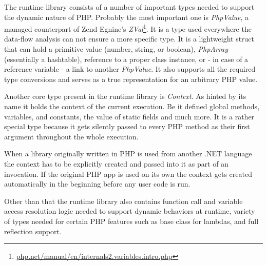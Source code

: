 The runtime library consists of a number of important types needed to support the dynamic nature of PHP. Probably the most important one is \emph{PhpValue}, a managed counterpart of Zend Egnine’s \emph{ZVal}\footnote{\href{http://php.net/manual/en/internals2.variables.intro.php}{php.net/manual/en/internals2.variables.intro.php}}. It is a type used everywhere the data-flow analysis can not ensure a more specific type. It is a lightweight struct that can hold a primitive value (number, string, or boolean), \emph{PhpArray} (essentially a hashtable), reference to a proper class instance, or - in case of a reference variable - a link to another \emph{PhpValue}. It also supports all the required type conversions and serves as a true representation for an arbitrary PHP value.

Another core type present in the runtime library is \emph{Context}. As hinted by its name it holds the context of the current execution. Be it defined global methods, variables, and constants, the value of static fields and much more. It is a rather special type because it gets silently passed to every PHP method as their first argument throughout the whole execution.

When a library originally written in PHP is used from another .NET language the context has to be explicitly created and passed into it as part of an invocation. If the original PHP app is used on its own the context gets created automatically in the beginning before any user code is run.

Other than that the runtime library also contains function call and variable access resolution logic needed to support dynamic behaviors at runtime, variety of types needed for certain PHP features such as base class for lambdas, and full reflection support. 
